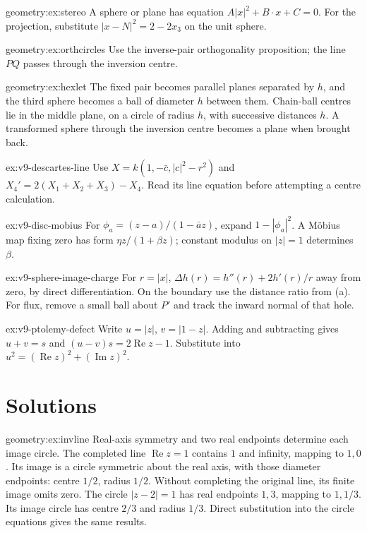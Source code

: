 \begin{hint}{geometry:ex:stereo}
A sphere or plane has equation $A|x|^2+B\cdot x+C=0$. For the projection, substitute $|x-N|^2=2-2x_3$ on the unit sphere.
\end{hint}
\begin{hint}{geometry:ex:orthcircles}
Use the inverse-pair orthogonality proposition; the line $PQ$ passes through the inversion centre.
\end{hint}
\begin{hint}{geometry:ex:hexlet}
The fixed pair becomes parallel planes separated by $h$, and the third sphere becomes a ball of diameter $h$ between them. Chain-ball centres lie in the middle plane, on a circle of radius $h$, with successive distances $h$. A transformed sphere through the inversion centre becomes a plane when brought back.
\end{hint}
\begin{hint}{ex:v9-descartes-line}
Use $X=k(1,-\bar c,|c|^2-r^2)$ and $X_4'=2(X_1+X_2+X_3)-X_4$. Read its line equation before attempting a centre calculation.
\end{hint}
\begin{hint}{ex:v9-disc-mobius}
For $\phi_a=(z-a)/(1-\bar az)$, expand $1-|\phi_a|^2$. A M\"obius map fixing zero has form $\eta z/(1+\beta z)$; constant modulus on $|z|=1$ determines $\beta$.
\end{hint}
\begin{hint}{ex:v9-sphere-image-charge}
For $r=|x|$, $\Delta h(r)=h''(r)+2h'(r)/r$ away from zero, by direct differentiation. On the boundary use the distance ratio from (a). For flux, remove a small ball about $P'$ and track the inward normal of that hole.
\end{hint}
\begin{hint}{ex:v9-ptolemy-defect}
Write $u=|z|$, $v=|1-z|$. Adding and subtracting gives $u+v=s$ and $(u-v)s=2\operatorname{Re}z-1$. Substitute into $u^2=(\operatorname{Re}z)^2+(\operatorname{Im}z)^2$.
\end{hint}

\section{Solutions}

\begin{solution}{geometry:ex:invline}
\idea Real-axis symmetry and two real endpoints determine each image circle.
\writeup The completed line $\operatorname{Re}z=1$ contains $1$ and infinity, mapping to $1,0$. Its image is a circle symmetric about the real axis, with those diameter endpoints: centre $1/2$, radius $1/2$. Without completing the original line, its finite image omits zero. The circle $|z-2|=1$ has real endpoints $1,3$, mapping to $1,1/3$. Its image circle has centre $2/3$ and radius $1/3$. Direct substitution into the circle equations gives the same results.
\end{solution}

